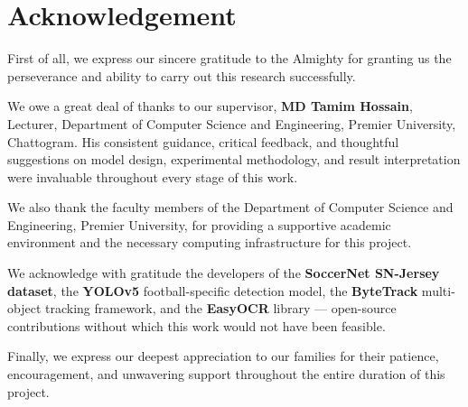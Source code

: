 \chapter*{Acknowledgement}

First of all, we express our sincere gratitude to the Almighty for
granting us the perseverance and ability to carry out this research
successfully.

We owe a great deal of thanks to our supervisor, \textbf{MD Tamim Hossain},
Lecturer, Department of Computer Science and Engineering, Premier
University, Chattogram. His consistent guidance, critical feedback, and
thoughtful suggestions on model design, experimental methodology, and
result interpretation were invaluable throughout every stage of this
work.

We also thank the faculty members of the Department of Computer Science
and Engineering, Premier University, for providing a supportive academic
environment and the necessary computing infrastructure for this project.

We acknowledge with gratitude the developers of the \textbf{SoccerNet
SN-Jersey dataset}, the \textbf{YOLOv5} football-specific detection model,
the \textbf{ByteTrack} multi-object tracking framework, and the
\textbf{EasyOCR} library --- open-source contributions without which
this work would not have been feasible.

Finally, we express our deepest appreciation to our families for their
patience, encouragement, and unwavering support throughout the entire
duration of this project.

\clearpage